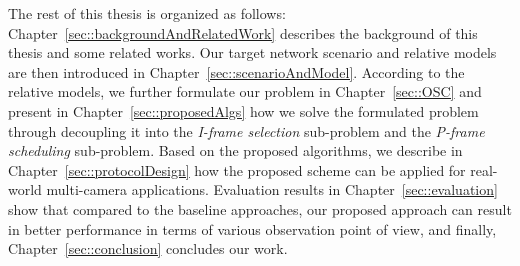The rest of this thesis is organized as follows:
Chapter~\ref{sec::backgroundAndRelatedWork} describes the background of this thesis and some related works.
Our target network scenario and relative models are then introduced in Chapter~\ref{sec::scenarioAndModel}.
According to the relative models, we further formulate our problem in Chapter~\ref{sec::OSC} and present in Chapter~\ref{sec::proposedAlgs} how we solve the formulated problem through decoupling it into the {\em I-frame selection} sub-problem and the {\em P-frame scheduling} sub-problem. 
Based on the proposed algorithms, we describe in Chapter~\ref{sec::protocolDesign} how the proposed scheme can be applied for real-world multi-camera applications.
Evaluation results in Chapter~\ref{sec::evaluation} show that compared to the baseline approaches, our proposed approach can result in better performance in terms of various observation point of view, and finally, Chapter~\ref{sec::conclusion} concludes our work.